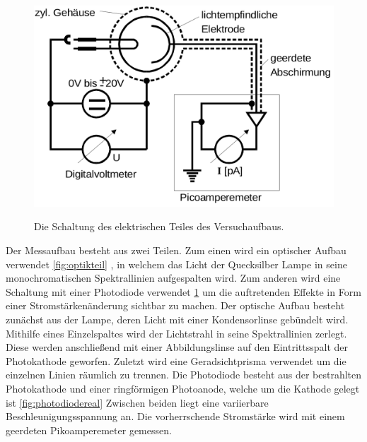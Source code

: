 \begin{figure}
	\centering
	\caption{Die Schaltung des elektrischen Teiles des Versuchaufbaus.}
	\includegraphics[width=\linewidth-150pt,height=\textheight-150pt,keepaspectratio]{content/Bilder/Elektrikteil.png}
	\label{fig:elektrikteil}
\end{figure}





Der Messaufbau besteht aus zwei Teilen. Zum einen wird ein optischer Aufbau verwendet \ref{fig:optikteil} ,
in welchem das Licht der Quecksilber Lampe in seine monochromatischen Spektrallinien
aufgespalten wird. Zum anderen wird eine Schaltung mit einer Photodiode verwendet \ref{fig:elektrikteil} um die auftretenden
Effekte in Form einer Stromstärkenänderung sichtbar zu machen. Der optische Aufbau
besteht zunächst aus der Lampe, deren Licht mit einer Kondensorlinse gebündelt wird.
 Mithilfe eines Einzelspaltes wird der Lichtstrahl in seine Spektrallinien zerlegt.
 Diese werden anschließend mit einer Abbildungslinse auf den Eintrittsspalt der
 Photokathode geworfen. Zuletzt wird eine Geradsichtprisma verwendet um die
 einzelnen Linien räumlich zu trennen. Die Photodiode besteht aus der bestrahlten
 Photokathode und einer ringförmigen Photoanode, welche um die Kathode gelegt ist \ref{fig:photodiodereal}
 Zwischen beiden liegt eine variierbare Beschleunigungsspannung an. Die vorherrschende
 Stromstärke wird mit einem geerdeten Pikoamperemeter gemessen.
